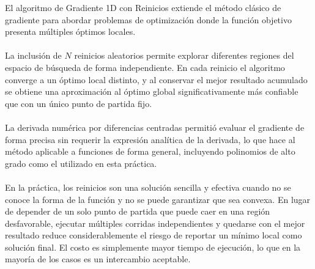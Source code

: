 \documentclass[11pt]{article}
\begin{document}
El algoritmo de Gradiente 1D con Reinicios extiende el método clásico de gradiente para abordar problemas de optimización donde la función objetivo presenta múltiples óptimos locales.
\\ \\
La inclusión de $N$ reinicios aleatorios permite explorar diferentes regiones del espacio de búsqueda de forma independiente. En cada reinicio el algoritmo converge a un óptimo local distinto, y al conservar el mejor resultado acumulado se obtiene una aproximación al óptimo global significativamente más confiable que con un único punto de partida fijo.
\\ \\
La derivada numérica por diferencias centradas permitió evaluar el gradiente de forma precisa sin requerir la expresión analítica de la derivada, lo que hace al método aplicable a funciones de forma general, incluyendo polinomios de alto grado como el utilizado en esta práctica.
\\ \\
En la práctica, los reinicios son una solución sencilla y efectiva cuando no se conoce la forma de la función y no se puede garantizar que sea convexa. En lugar de depender de un solo punto de partida que puede caer en una región desfavorable, ejecutar múltiples corridas independientes y quedarse con el mejor resultado reduce considerablemente el riesgo de reportar un mínimo local como solución final. El costo es simplemente mayor tiempo de ejecución, lo que en la mayoría de los casos es un intercambio aceptable.
\end{document}

